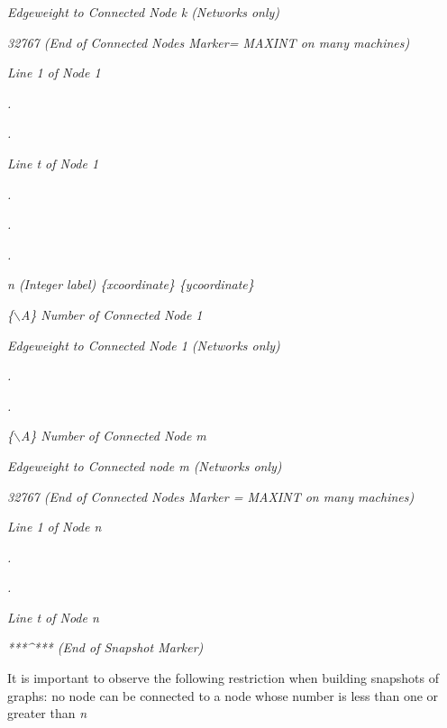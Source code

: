 \documentclass[12pt]{article}
\begin{document}
\textit{{\footnotesize{}                Edgeweight to Connected Node k  (Networks only)}}

\textit{{\footnotesize{}                32767 (End of Connected Nodes Marker= MAXINT on many machines)}}

\textit{{\footnotesize{}                Line 1 of Node 1}}

\textit{{\footnotesize{}                        .}}

\textit{{\footnotesize{}                        .}}

\textit{{\footnotesize{}                Line t of Node 1}}

\textit{{\footnotesize{}                        .}}

\textit{{\footnotesize{}                        .}}

\textit{{\footnotesize{}                        .}}

\textit{{\footnotesize{}                n  (Integer label) \{xcoordinate\} \{ycoordinate\}}}

\textit{{\footnotesize{}                \{\ensuremath{\backslash}A\} Number of Connected Node 1}}

\textit{{\footnotesize{}                Edgeweight  to Connected Node 1  (Networks only)}}

\textit{{\footnotesize{}                        .}}

\textit{{\footnotesize{}                        .}}

\textit{{\footnotesize{}                \{\ensuremath{\backslash}A\} Number of Connected Node  m}}

\textit{{\footnotesize{}                Edgeweight  to Connected node m (Networks only)}}

\textit{{\footnotesize{}                32767 (End of Connected Nodes Marker = MAXINT on many machines)}}

\textit{{\footnotesize{}                Line 1 of Node n}}

\textit{{\footnotesize{}                        .}}

\textit{{\footnotesize{}                        .}}

\textit{{\footnotesize{}                Line t of Node n}}

\textit{{\footnotesize{}                ***\^{}*** (End of Snapshot Marker)}}



{\footnotesize{}It is important to observe the following restriction when building snapshots of graphs:  no node can be connected to a node whose number is less than one or greater than }\textit{{\footnotesize{}n}}
\end{document}
